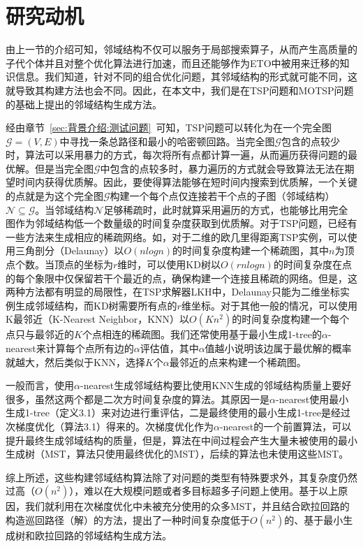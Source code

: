 \section{研究动机}
\label{sec:NS_Method:研究动机}
由上一节的介绍可知，邻域结构不仅可以服务于局部搜索算子，从而产生高质量的子代个体并且对整个优化算法进行加速，而且还能够作为ETO中被用来迁移的知识信息。我们知道，针对不同的组合优化问题，其邻域结构的形式就可能不同，这就导致其构建方法也会不同。因此，在本文中，我们是在TSP问题和MOTSP问题的基础上提出的邻域结构生成方法。
\par
经由章节~\ref{sec:背景介绍:测试问题}~可知，TSP问题可以转化为在一个完全图$\mathcal{G} = (V,E)$中寻找一条总路径和最小的哈密顿回路。当完全图$\mathcal{G}$包含的点较少时，算法可以采用暴力的方式，每次将所有点都计算一遍，从而遍历获得问题的最优解。但是当完全图$\mathcal{G}$中包含的点较多时，暴力遍历的方式就会导致算法无法在期望时间内获得优质解。因此，要使得算法能够在短时间内搜索到优质解，一个关键的点就是为这个完全图$\mathcal{G}$构建一个每个点仅连接若干个点的子图（邻域结构）$\mathcal{N} \subseteq \mathcal{G}$。当邻域结构$\mathcal{N}$足够稀疏时，此时就算采用遍历的方式，也能够比用完全图作为邻域结构低一个数量级的时间复杂度获取到优质解。对于TSP问题，已经有一些方法来生成相应的稀疏网络。如，对于二维的欧几里得距离TSP实例，可以使用三角剖分（Delaunay\cite{krasnogor1995new}）以$O(nlogn)$的时间复杂度构建一个稀疏图，其中$n$为顶点个数。当顶点的坐标为$r$维时，可以使用KD树\cite{bentley1975multidimensional}以$O(rnlogn)$的时间复杂度在点的每个象限中仅保留若干个最近的点，确保构建一个连接且稀疏的网络。但是，这两种方法都有明显的局限性，在TSP求解器LKH\cite{helsgaun2000effective,helsgaun2009general}中，Delaunay只能为二维坐标实例生成邻域结构，而KD树需要所有点的$r$维坐标。对于其他一般的情况，可以使用K最邻近（K-Nearest Neighbor，KNN）以$O(Kn^2)$的时间复杂度构建一个每个点只与最邻近的$K$个点相连的稀疏图。我们还常使用基于最小生成1-tree\cite{held1970traveling,held1971traveling}的$\alpha$-nearest来计算每个点所有边的$\alpha$评估值，其中$\alpha$值越小说明该边属于最优解的概率就越大，然后类似于KNN，选择$K$个$\alpha$最邻近的点来构建一个稀疏图。
\par
一般而言，使用$\alpha$-nearest生成邻域结构要比使用KNN生成的邻域结构质量上要好很多，虽然这两个都是二次方时间复杂度的算法。其原因一是$\alpha$-nearest使用最小生成1-tree（定义3.1）来对边进行重评估，二是最终使用的最小生成1-tree是经过次梯度优化（算法3.1）得来的。次梯度优化作为$\alpha$-nearest的一个前置算法，可以提升最终生成邻域结构的质量，但是，算法在中间过程会产生大量未被使用的最小生成树（MST，算法只使用最终优化的MST），后续的算法也未使用这些MST。 
\par
综上所述，这些构建邻域结构算法除了对问题的类型有特殊要求外，其复杂度仍然过高（$O(n^2)$），难以在大规模问题或者多目标超多子问题上使用。基于以上原因，我们就利用在次梯度优化中未被充分使用的众多MST，并且结合欧拉回路的构造巡回路径（解）的方法，提出了一种时间复杂度低于$O(n^2)$的、基于最小生成树和欧拉回路的邻域结构生成方法。

